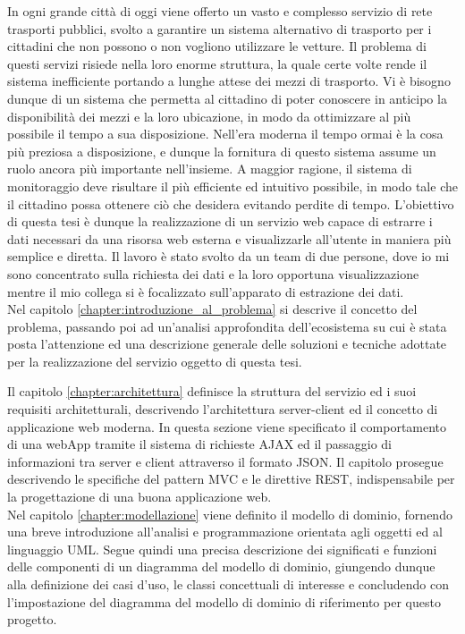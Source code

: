 %
In ogni grande città di oggi viene offerto un vasto e complesso servizio di rete trasporti pubblici, svolto a garantire un sistema alternativo di trasporto per i cittadini che non possono o non vogliono utilizzare le vetture. Il problema di questi servizi risiede nella loro enorme struttura, la quale certe volte rende il sistema inefficiente portando a lunghe attese dei mezzi di trasporto. Vi è bisogno dunque di un sistema che permetta al cittadino di poter conoscere in anticipo la disponibilità dei mezzi e la loro ubicazione, in modo da ottimizzare al più possibile il tempo a sua disposizione. Nell'era moderna il tempo ormai è la cosa più preziosa a disposizione, e dunque la fornitura di questo sistema assume un ruolo ancora più importante nell'insieme. A maggior ragione, il sistema di monitoraggio deve risultare il più efficiente ed intuitivo possibile, in modo tale che il cittadino possa ottenere ciò che desidera evitando perdite di tempo. L'obiettivo di questa tesi è dunque la realizzazione di un servizio web capace di estrarre i dati necessari da una risorsa web esterna e visualizzarle all'utente in maniera più semplice e diretta. Il lavoro è stato svolto da un team di due persone, dove io mi sono concentrato sulla richiesta dei dati e la loro opportuna visualizzazione mentre il mio collega si è focalizzato sull'apparato di estrazione dei dati.\\

Nel capitolo \ref{chapter:introduzione_al_problema} si descrive il concetto del problema, passando poi ad un'analisi approfondita dell'ecosistema su cui è stata posta l'attenzione ed una descrizione generale delle soluzioni e tecniche adottate per la realizzazione del servizio oggetto di questa tesi.\\
\newpage

Il capitolo \ref{chapter:architettura} definisce la struttura del servizio ed i suoi requisiti architetturali, descrivendo l'architettura server-client ed il concetto di applicazione web moderna. In questa sezione viene specificato il comportamento di una webApp tramite il sistema di richieste AJAX ed il passaggio di informazioni tra server e client attraverso il formato JSON. Il capitolo prosegue descrivendo le specifiche del pattern MVC e le direttive REST, indispensabile per la progettazione di una buona applicazione web.\\

Nel capitolo \ref{chapter:modellazione} viene definito il modello di dominio, fornendo una breve introduzione all'analisi e programmazione orientata agli oggetti ed al linguaggio UML. Segue quindi una precisa descrizione dei significati e funzioni delle componenti di un diagramma del modello di dominio, giungendo dunque alla definizione dei casi d'uso, le classi concettuali di interesse e concludendo con l'impostazione del diagramma del modello di dominio di riferimento per questo progetto.\\

